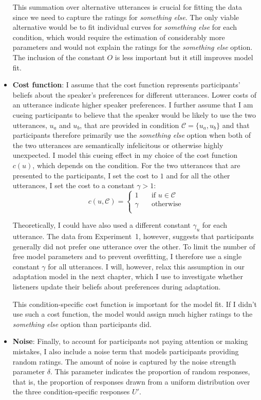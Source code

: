 \begin{itemize}
This summation over alternative utterances is crucial for fitting the data since we need to
capture the ratings for \textit{something else}. The only viable alternative would be
to fit individual curves for \textit{something else} for each condition, which would require
the estimation of considerably more parameters and would not explain the ratings for the
\textit{something else} option. The inclusion of the constant $O$ is less important but it
still improves model fit.


\item \textbf{Cost function}: I assume that the cost function represents participants' beliefs about the speaker's 
preferences for different utterances. Lower costs of an utterance indicate higher speaker preferences. I further 
assume that I am cueing participants to believe that the speaker would be likely to use the two utterances, $u_a$ 
and $u_b$, that are provided in condition $\mathscr{C}=\{u_a, u_b\}$ and that participants therefore primarily use the 
\textit{something else} option when both of the two utterances are semantically infelicitous or otherwise highly unexpected. 
I model this cueing effect in my choice of the cost function $c(u)$, which depends on the condition. For the two utterances 
that are presented to the participants, I set the cost to $1$ and for all the other utterances, I set the cost to a constant $\gamma > 1$:
$$
c(u, \mathscr{C}) = 
     \begin{cases}
       1 &\quad\text{if } u  \in \mathscr{C}\\
       \gamma &\quad\text{otherwise} \\
     \end{cases}
$$

Theoretically, I could have also used a different constant $\gamma_u$ for each utterance. The data from
Experiment~1, however, suggests that participants generally did not prefer one utterance over 
the other. To limit the number of free model parameters and to prevent overfitting, I therefore use a single
constant $\gamma$ for all utterances. I will, however, relax this assumption in our adaptation model in the next chapter, which
I use to investigate whether listeners update their beliefs about preferences during adaptation.

This condition-specific cost function is important for the model fit. If I didn't use such a cost function, 
the model would assign much higher ratings to the \textit{something else} option than participants did.

\item \textbf{Noise}: Finally, to account for participants not paying attention or making mistakes, 
I also include a noise term that models participants providing random ratings.
The amount of noise is captured by the noise strength parameter $\delta$. This parameter
indicates the proportion of random responses, that is, the proportion of responses drawn from a uniform distribution
over the three condition-specific responses $U'$. 


\end{itemize}
